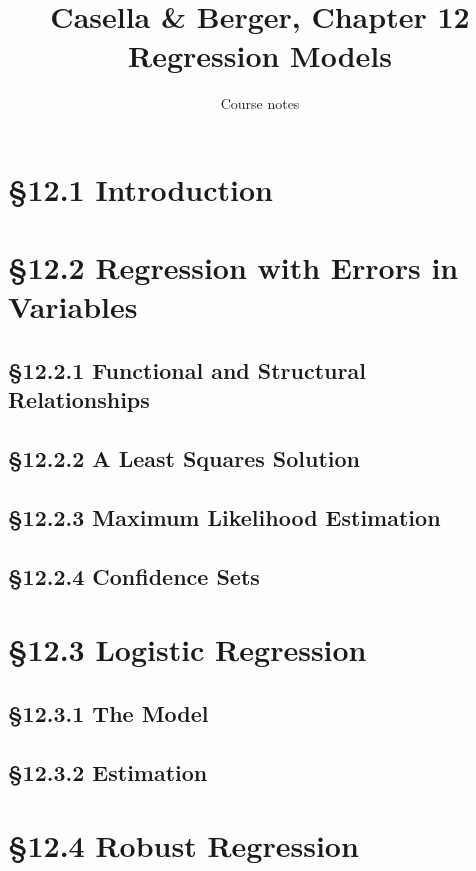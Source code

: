 \documentclass[11pt]{article}
\title{Casella \& Berger, Chapter 12\\[2pt]\large Regression Models}
\author{Course notes}\date{}
\begin{document}
\maketitle


\section{\S12.1 Introduction}

\section{\S12.2 Regression with Errors in Variables}

\subsection{\S12.2.1 Functional and Structural Relationships}

\subsection{\S12.2.2 A Least Squares Solution}

\subsection{\S12.2.3 Maximum Likelihood Estimation}

\subsection{\S12.2.4 Confidence Sets}

\section{\S12.3 Logistic Regression}

\subsection{\S12.3.1 The Model}

\subsection{\S12.3.2 Estimation}

\section{\S12.4 Robust Regression}
\end{document}
